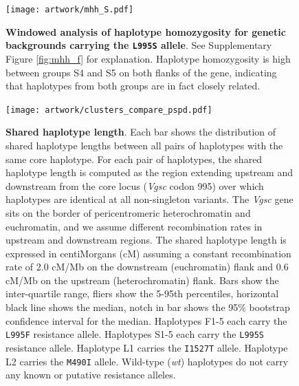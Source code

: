 \documentclass[a4paper,11pt,abstracton,hidelinks]{scrartcl}
\begin{document}
\clearpage

%
\begin{figure}[!b]
  \texttt{[image: artwork/mhh\_S.pdf]}
  \caption{\textbf{Windowed analysis of haplotype homozygosity for genetic backgrounds carrying the \texttt{L995S} allele}. See Supplementary Figure \ref{fig:mhh_f} for explanation. Haplotype homozygosity is high between groups S4 and S5 on both flanks of the gene, indicating that haplotypes from both groups are in fact closely related.}
  \label{fig:mhh_s}
\end{figure}


\clearpage

%
\begin{figure}[!b]
  \texttt{[image: artwork/clusters\_compare\_pspd.pdf]}
  \caption{\textbf{Shared haplotype length}. Each bar shows the distribution of shared haplotype lengths between all pairs of haplotypes with the same core haplotype. For each pair of haplotypes, the shared haplotype length is computed as the region extending upstream and downstream from the core locus (\textit{Vgsc} codon 995) over which haplotypes are identical at all non-singleton variants. The \textit{Vgsc} gene sits on the border of pericentromeric heterochromatin and euchromatin, and we assume different recombination rates in upstream and downstream regions. The shared haplotype length is expressed in centiMorgans (cM) assuming a constant recombination rate of 2.0 cM/Mb on the downstream (euchromatin) flank and 0.6 cM/Mb on the upstream (heterochromatin) flank. Bars show the inter-quartile range, fliers show the 5-95th percentiles, horizontal black line shows the median, notch in bar shows the 95\% bootstrap confidence interval for the median. Haplotypes F1-5 each carry the \texttt{L995F} resistance allele. Haplotypes S1-5 each carry the \texttt{L995S} resistance allele. Haplotype L1 carries the \texttt{I1527T} allele. Haplotype L2 carries the \texttt{M490I} allele. Wild-type (\textit{wt}) haplotypes do not carry any known or putative resistance alleles.}
  \label{fig:pspd}
\end{figure}
\end{document}
